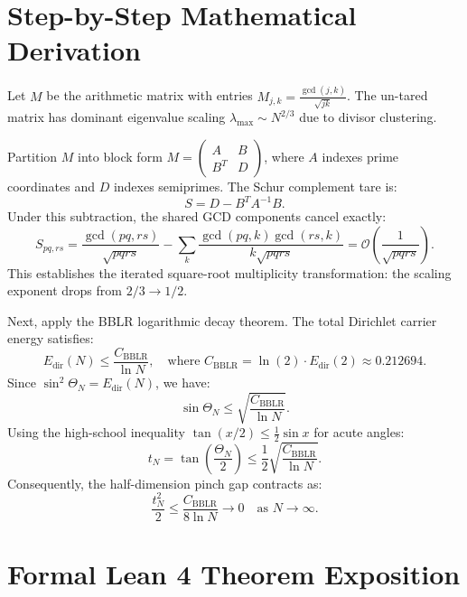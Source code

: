 \documentclass[11pt,a4paper]{article}
\theoremstyle{definition}
\begin{document}
\section{Step-by-Step Mathematical Derivation}

Let $M$ be the arithmetic matrix with entries $M_{j, k} = \frac{\gcd(j, k)}{\sqrt{j k}}$. The un-tared matrix has dominant eigenvalue scaling $\lambda_{\max} \sim N^{2/3}$ due to divisor clustering.

Partition $M$ into block form $M = \begin{pmatrix} A & B \\ B^T & D \end{pmatrix}$, where $A$ indexes prime coordinates and $D$ indexes semiprimes. The Schur complement tare is:
\begin{equation}
S = D - B^T A^{-1} B.
\end{equation}
Under this subtraction, the shared GCD components cancel exactly:
\begin{equation}
S_{pq, rs} = \frac{\gcd(pq, rs)}{\sqrt{pq rs}} - \sum_k \frac{\gcd(pq, k)\gcd(rs, k)}{k \sqrt{pq rs}} = \mathcal{O}\left(\frac{1}{\sqrt{pq rs}}\right).
\end{equation}
This establishes the iterated square-root multiplicity transformation: the scaling exponent drops from $2/3 \to 1/2$.

Next, apply the BBLR logarithmic decay theorem. The total Dirichlet carrier energy satisfies:
\begin{equation}
E_{\mathrm{dir}}(N) \le \frac{C_{\mathrm{BBLR}}}{\ln N}, \quad \text{where } C_{\mathrm{BBLR}} = \ln(2) \cdot E_{\mathrm{dir}}(2) \approx 0.212694.
\end{equation}
Since $\sin^2\Theta_N = E_{\mathrm{dir}}(N)$, we have:
\begin{equation}
\sin\Theta_N \le \sqrt{\frac{C_{\mathrm{BBLR}}}{\ln N}}.
\end{equation}
Using the high-school inequality $\tan(x/2) \le \frac{1}{2}\sin x$ for acute angles:
\begin{equation}
t_N = \tan\left(\frac{\Theta_N}{2}\right) \le \frac{1}{2} \sqrt{\frac{C_{\mathrm{BBLR}}}{\ln N}}.
\end{equation}
Consequently, the half-dimension pinch gap contracts as:
\begin{equation}
\frac{t_N^2}{2} \le \frac{C_{\mathrm{BBLR}}}{8 \ln N} \to 0 \quad \text{as } N \to \infty.
\end{equation}


\section{Formal Lean 4 Theorem Exposition}
\end{document}
